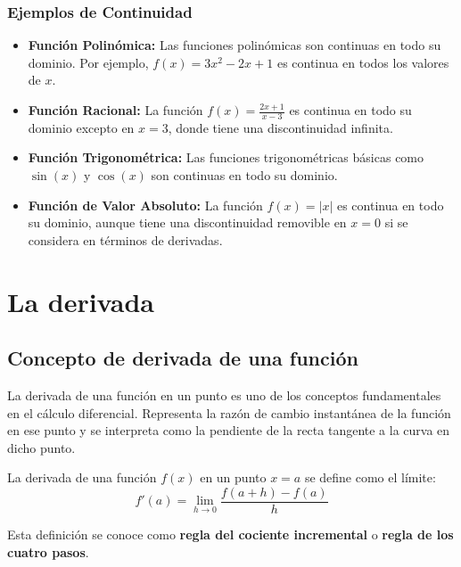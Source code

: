 \subsubsection{Ejemplos de Continuidad}

\begin{itemize}
    \item \textbf{Función Polinómica:} Las funciones polinómicas son continuas en todo su dominio. Por ejemplo, \( f(x) = 3x^2 - 2x + 1 \) es continua en todos los valores de \( x \).
    
    \item \textbf{Función Racional:} La función \( f(x) = \frac{2x + 1}{x - 3} \) es continua en todo su dominio excepto en \( x = 3 \), donde tiene una discontinuidad infinita.
    
    \item \textbf{Función Trigonométrica:} Las funciones trigonométricas básicas como \( \sin(x) \) y \( \cos(x) \) son continuas en todo su dominio.
    
    \item \textbf{Función de Valor Absoluto:} La función \( f(x) = |x| \) es continua en todo su dominio, aunque tiene una discontinuidad removible en \( x = 0 \) si se considera en términos de derivadas.
\end{itemize}







\section{La derivada} %
\subsection{Concepto de derivada de una función}

La derivada de una función en un punto es uno de los conceptos fundamentales en el cálculo diferencial. Representa la razón de cambio instantánea de la función en ese punto y se interpreta como la pendiente de la recta tangente a la curva en dicho punto.

\begin{definition}[Derivada]
    La derivada de una función $f(x)$ en un punto $x = a$ se define como el límite:
\begin{equation}
    f'(a) = \lim_{h \to 0} \frac{f(a+h) - f(a)}{h}
\end{equation}

\noindent Esta definición se conoce como \textbf{regla del cociente incremental} o \textbf{regla de los cuatro pasos}.
\end{definition}

